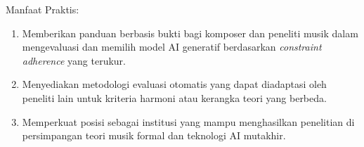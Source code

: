 Manfaat Praktis:
\begin{enumerate}
    \item Memberikan panduan berbasis bukti bagi komposer dan peneliti musik dalam mengevaluasi dan memilih model AI generatif berdasarkan \textit{constraint adherence} yang terukur.
    \item Menyediakan metodologi evaluasi otomatis yang dapat diadaptasi oleh peneliti lain untuk kriteria harmoni atau kerangka teori yang berbeda.
    \item Memperkuat posisi \programstudy{} \institutionname{} sebagai institusi yang mampu menghasilkan penelitian di persimpangan teori musik formal dan teknologi AI mutakhir.
\end{enumerate}
